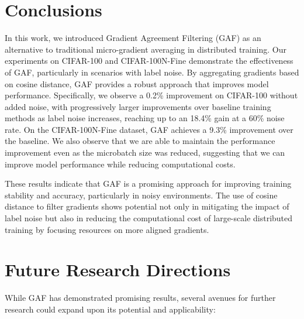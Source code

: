 \section{Conclusions}
\label{sec:conclusions}

In this work, we introduced Gradient Agreement Filtering (GAF) as an alternative to traditional micro-gradient averaging in distributed training. Our experiments on CIFAR-100 and CIFAR-100N-Fine demonstrate the effectiveness of GAF, particularly in scenarios with label noise. By aggregating gradients based on cosine distance, GAF provides a robust approach that improves model performance. Specifically, we observe a 0.2\% improvement on CIFAR-100 without added noise, with progressively larger improvements over baseline training methods as label noise increases, reaching up to an 18.4\% gain at a 60\% noise rate. On the CIFAR-100N-Fine dataset, GAF achieves a 9.3\% improvement over the baseline. We also observe that we are able to maintain the performance improvement even as the microbatch size was reduced, suggesting that we can improve model performance while reducing computational costs.

These results indicate that GAF is a promising approach for improving training stability and accuracy, particularly in noisy environments. The use of cosine distance to filter gradients shows potential not only in mitigating the impact of label noise but also in reducing the computational cost of large-scale distributed training by focusing resources on more aligned gradients.

\section{Future Research Directions}
\label{sec:future_work}

While GAF has demonstrated promising results, several avenues for further research could expand upon its potential and applicability:

